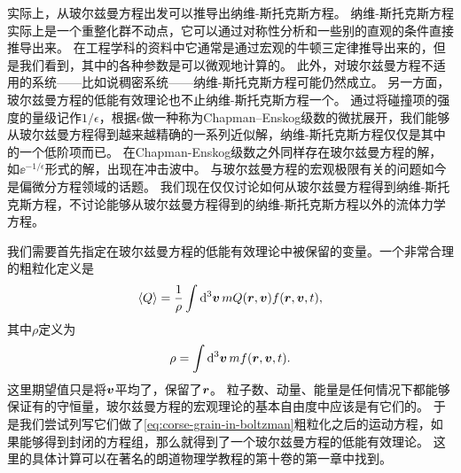 实际上，从玻尔兹曼方程出发可以推导出纳维-斯托克斯方程。
纳维-斯托克斯方程实际上是一个重整化群不动点，它可以通过对称性分析和一些别的直观的条件直接推导出来\cite{Visscher_1985}。
在工程学科的资料中它通常是通过宏观的牛顿三定律推导出来的，但是我们看到，其中的各种参数是可以微观地计算的。
此外，对玻尔兹曼方程不适用的系统——比如说稠密系统——纳维-斯托克斯方程可能仍然成立。
另一方面，玻尔兹曼方程的低能有效理论也不止纳维-斯托克斯方程一个。
通过将碰撞项的强度的量级记作$1/\epsilon$，根据$\epsilon$做一种称为Chapman–Enskog级数的微扰展开\cite{chapman_mathematical_1990}，我们能够从玻尔兹曼方程得到越来越精确的一系列近似解，纳维-斯托克斯方程仅仅是其中的一个低阶项而已。
在Chapman-Enskog级数之外同样存在玻尔兹曼方程的解，如$\ee^{- 1 / \epsilon}$形式的解，出现在冲击波中。    
与玻尔兹曼方程的宏观极限有关的问题如今是偏微分方程领域的话题。
我们现在仅仅讨论如何从玻尔兹曼方程得到纳维-斯托克斯方程，不讨论能够从玻尔兹曼方程得到的纳维-斯托克斯方程以外的流体力学方程。

我们需要首先指定在玻尔兹曼方程的低能有效理论中被保留的变量。一个非常合理的粗粒化定义是
\begin{equation}
    \expval{Q} = \frac{1}{\rho} \int \dd[3]{\vb*{v}} m Q(\vb*{r}, \vb*{v}) f(\vb*{r}, \vb*{v}, t),
    \label{eq:corse-grain-in-boltzman}
\end{equation}
其中$\rho$定义为
\begin{equation}
    \rho = \int \dd[3]{\vb*{v}} m f(\vb*{r}, \vb*{v}, t).
\end{equation}
这里期望值只是将$\vb*{v}$平均了，保留了$\vb*{r}$。
粒子数、动量、能量是任何情况下都能够保证有的守恒量，玻尔兹曼方程的宏观理论的基本自由度中应该是有它们的。
于是我们尝试列写它们做了\eqref{eq:corse-grain-in-boltzman}粗粒化之后的运动方程，如果能够得到封闭的方程组，那么就得到了一个玻尔兹曼方程的低能有效理论。
这里的具体计算可以在著名的朗道物理学教程的第十卷\cite{lifsic_physical_2008}的第一章中找到。


